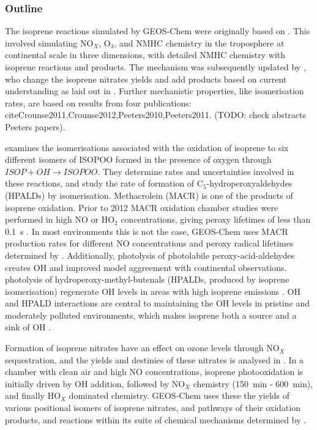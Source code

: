     \subsubsection{Outline}
      The isoprene reactions simulated by GEOS-Chem were originally based on \textcite{Horowitz1998}.
      This involved simulating NO$_X$, O$_3$, and NMHC chemistry in the troposphere at continental scale in three dimensions, with detailed NMHC chemistry with isoprene reactions and products.
      The mechanism was subsequently updated by \textcite{Mao2013}, who change the isoprene nitrates yields and add products based on current understanding as laid out in \textcite{Paulot2009a,Paulot2009b}.
      Further mechanistic properties, like isomerisation rates, are based on results from four publications: cite{Crounse2011,Crounse2012,Peeters2010,Peeters2011}.
      (TODO: check abstracts Peeters papers).
      
      \textcite{Crounse2011} examines the isomerisations associated with the oxidation of isoprene to six different isomers of ISOPOO formed in the presence of oxygen through $ISOP + OH \to ISOPOO$.
      They determine rates and uncertainties involved in these reactions, and study the rate of formation of C$_5$-hydroperoxyaldehydes (HPALDs) by isomerisation.
      Methacrolein (MACR) is one of the products of isoprene oxidation.
      Prior to 2012 MACR oxidation chamber studies were performed in high NO or HO$_2$ concentrations, giving peroxy lifetimes of less than 0.1~s \parencite{Crounse2012}.
      In most environments this is not the case, GEOS-Chem uses MACR production rates for different NO concentrations and peroxy radical lifetimes determined by \textcite{Crounse2012}.
      Additionally, photolysis of photolabile peroxy-acid-aldehydes creates OH and improved model aggreement with continental observations.
      photolysis of hydroperoxy-methyl-butenals (HPALDs, produced by isoprene isomerisation) regenerate OH levels in areas with high isoprene emissions \parencite{Peeters2010}.
      OH and HPALD interactions are central to maintaining the OH levels in pristine and moderately polluted environments, which makes isoprene both a source and a sink of OH \parencite{Peeters2010,Taraborrelli2012}.
      
      Formation of isoprene nitrates have an effect on ozone levels through NO$_X$ sequestration, and the yields and destinies of these nitrates is analysed in \textcite{Paulot2009a}.
      In a chamber with clean air and high NO concentrations, isoprene photooxidation is initially driven by OH addition, followed by NO$_X$ chemistry (150~min - 600~min), and finally HO$_X$ dominated chemistry.
      GEOS-Chem uses these the yields of various positional isomers of isoprene nitrates, and pathways of their oxidation products, and reactions within its suite of chemical mechanisms determined by \textcite{Paulot2009a,Mao2013}.
      

